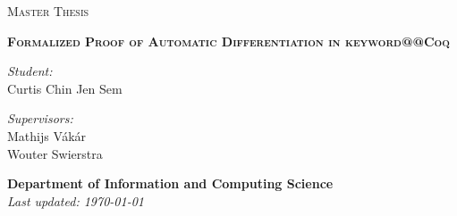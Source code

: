 \documentclass[11pt, final]{article}
\makeatletter
\def\Vakar{V\'{a}k\'{a}r}
\def\<#1>{\csname keyword@@#1\endcsname}
\makeatother
\begin{document}
\begin{titlepage}

\begin{figure}
   \begin{minipage}{0.48\textwidth}
   \begin{flushleft}
   \end{flushleft}
   \end{minipage}\hfill
   \begin{minipage}{0.48\textwidth}
   \begin{flushright}
   \end{flushright}
   \end{minipage}
\end{figure}

\thispagestyle{fancy}

\vspace{1in}

\center

\textsc{\large Master Thesis}

\vspace{0.5in}

\noindent\makebox[\linewidth]{\rule{\linewidth}{1.2pt}}
\textsc{\textbf{\large Formalized Proof of Automatic Differentiation in \<Coq>}}
\noindent\makebox[\linewidth]{\rule{\linewidth}{1.2pt}}

\vspace{0.5in}

\begin{minipage}{0.48\textwidth}
    \begin{flushleft}
        \textit{Student:} \\
        Curtis Chin Jen Sem \\
    \end{flushleft}
\end{minipage}
\begin{minipage}{0.48\textwidth}
    \begin{flushright}
    \textit{Supervisors:} \\
    Mathijs \Vakar{} \\
    Wouter Swierstra \\
    \end{flushright}
\end{minipage}

\vspace{2in}

\textbf{\large Department of Information and Computing Science} \\
\textit{Last updated: \today}

\end{titlepage}
\end{document}
